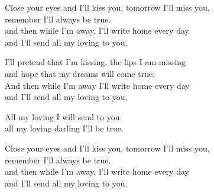 
\ve{}
Close your eyes and I'll kiss you, tomorrow I'll miss you,\\
remember I'll always be true.\\
and then while I'm away, I'll write home every day\\
and I'll send all my loving to you.

\ve{}
I'll pretend that I'm kissing, the lips I am missing\\
and hope that my dreams will come true.\\
And then while I'm away I'll write home every day\\
and I'll send all my loving to you.

\cho
All my loving I will send to you\\
all my loving darling I'll be true.

\ve{}
Close your eyes and I'll kiss you, tomorrow I'll miss you,\\
remember I'll always be true.\\
and then while I'm away, I'll write home every day\\
and I'll send all my loving to you.

\cho{}

\esong{}